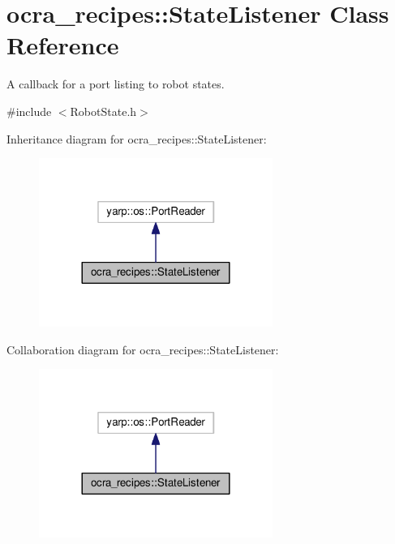 \hypertarget{classocra__recipes_1_1StateListener}{}\section{ocra\+\_\+recipes\+:\+:State\+Listener Class Reference}
\label{classocra__recipes_1_1StateListener}


A callback for a port listing to robot states.  




{\ttfamily \#include $<$Robot\+State.\+h$>$}



Inheritance diagram for ocra\+\_\+recipes\+:\+:State\+Listener\+:
\nopagebreak
\begin{figure}[H]
\begin{center}
\leavevmode
\includegraphics[width=216pt]{d8/db2/classocra__recipes_1_1StateListener__inherit__graph}
\end{center}
\end{figure}


Collaboration diagram for ocra\+\_\+recipes\+:\+:State\+Listener\+:
\nopagebreak
\begin{figure}[H]
\begin{center}
\leavevmode
\includegraphics[width=216pt]{d1/d53/classocra__recipes_1_1StateListener__coll__graph}
\end{center}
\end{figure}
